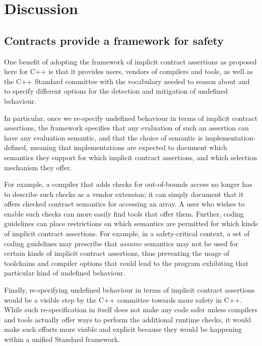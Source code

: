 \section{Discussion}

\subsection{Contracts provide a framework for safety}

One benefit of adopting the framework of implicit contract assertions as proposed here for C++ is that it provides users, vendors of compilers and tools, as well as the C++ Standard committee with the vocabulary needed to reason about and  to specify different options for the detection and mitigation of undefined behaviour.

In particular, once we re-specify undefined behaviour in terms of implicit contract assertions, the \cite{P2900R8} framework specifies that any evaluation of such an assertion can have any evaluation semantic, and that the choice of semantic is implementation-defined, meaning that implementations are expected to document which semantics they support for which implicit contract assertions, and which selection mechanism they offer.

For example, a compiler that adds checks for out-of-bounds access no longer has to describe such checks as a vendor extension; it can simply document that it offers checked contract semantics for accessing an array. A user who wishes to enable such checks can more easily find tools that offer them. Further, coding guidelines can place restrictions on which semantics are permitted for which kinds of implicit contract assertions. For example, in a safety-critical context, a set of coding guidelines may prescribe that \emph{assume} semantics may not be used for certain kinds of implicit contract assertions, thus preventing the usage of toolchains and compiler options that could lead to the program exhibiting that particular kind of undefined behaviour.

Finally, re-specifying undefined behaviour in terms of implicit contract assertions would be a visible step by the C++ committee towards more safety in C++. While such re-specification in itself does not make any code safer unless compilers and tools actually offer ways to perform the additional runtime checks, it would make such efforts more visible and explicit because they would be happening within a unified Standard framework.

	
